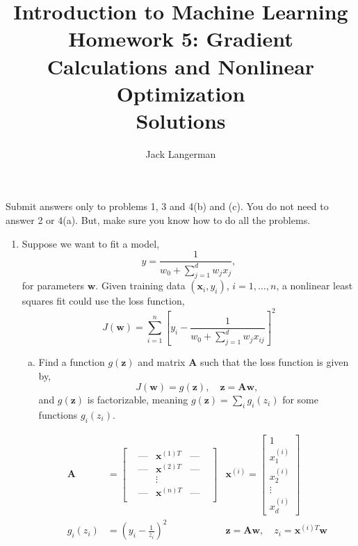 \documentclass[11pt]{article}
\newcommand{\ubf}{\mathbf{u}}
\newcommand{\wbf}{\mathbf{w}}
\newcommand{\xbf}{\mathbf{x}}
\newcommand{\zbf}{\mathbf{z}}
\newcommand{\Abf}{\mathbf{A}}
\begin{document}
\title{Introduction to Machine Learning\\
Homework 5:  Gradient Calculations and Nonlinear Optimization\\Solutions}
\author{Jack Langerman}
\date{}

\maketitle

Submit answers only to problems 1, 3 and 4(b) and (c).  You do not need to answer 2 or 4(a).
But, make sure you know how to do all the problems.

\begin{enumerate}

\item Suppose we want to fit a model,
\[
    \hat{y} = \frac{1}{w_0 + \sum_{j=1}^d w_jx_j},
\]
for parameters $\wbf$. Given training data $(\xbf_i,y_i)$, $i=1,\ldots,n$,
a nonlinear least squares fit could use the loss function,
\[
    J(\wbf) = \sum_{i=1}^n \left[y_i -
        \frac{1}{w_0 + \sum_{j=1}^d w_jx_{ij}}\right]^2
\]



\begin{enumerate}[(a)]
\item Find a function $g(\zbf)$ and matrix $\Abf$ such that
the loss function is given by,
\[
    J(\wbf) = g(\zbf), \quad \zbf = \Abf\wbf,
\]
and $g(\zbf)$ is factorizable, meaning $g(\zbf) = \sum_i g_i(z_i)$ for
some functions $g_i(z_i)$.

\begin{align*}
	\Abf &= \begin{bmatrix}
                 & \text{---}  & \xbf^{(1)T} & \text{---} & \\
                 & \text{---}  & \xbf^{(2)T} & \text{---} & \\
                 &  & \vdots  &    \\
                 & \text{---}  & \xbf^{(n)T} & \text{---} & \\
		     \end{bmatrix}
    & \xbf^{(i)} = \begin{bmatrix}
      	 		1 \\ x^{(i)}_1 \\ x^{(i)}_2 \\ \vdots \\ x^{(i)}_d 
                  \end{bmatrix} \\
     g_i(z_i) &= \left( y_i - \frac{1}{z_i} \right)^2 
	 & \zbf = \Abf \wbf, \quad z_i = \xbf^{(i)T} \wbf \\
\end{align*}
		


\end{enumerate}
\end{enumerate}
\end{document}
